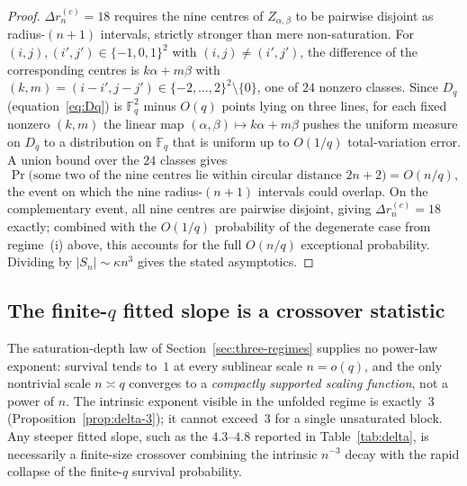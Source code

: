     \begin{proof}
      $\Delta r_n^{(c)}=18$ requires the nine centres of $Z_{\alpha,\beta}$ to be pairwise
      disjoint as radius-$(n{+}1)$ intervals, strictly stronger than mere non-saturation.
      For $(i,j),(i',j')\in\{-1,0,1\}^2$ with $(i,j)\neq(i',j')$, the difference of the
      corresponding centres is $k\alpha+m\beta$ with $(k,m)=(i-i',j-j')\in\{-2,\dots,2\}^2
      \setminus\{0\}$, one of $24$ nonzero classes.
      Since $D_q$ (equation~\eqref{eq:Dq}) is $\mathbb{F}_q^2$ minus $O(q)$ points lying on
      three lines, for each fixed nonzero $(k,m)$ the linear map
      $(\alpha,\beta)\mapsto k\alpha+m\beta$ pushes the uniform measure on $D_q$ to a
      distribution on $\mathbb{F}_q$ that is uniform up to $O(1/q)$ total-variation error.
      A union bound over the $24$ classes gives
      \[
        \Pr\bigl(\text{some two of the nine centres lie within circular distance }2n{+}2\bigr)
        = O(n/q),
      \]
      the event on which the nine radius-$(n{+}1)$ intervals could overlap.
      On the complementary event, all nine centres are pairwise disjoint, giving
      $\Delta r_n^{(c)}=18$ exactly; combined with the $O(1/q)$ probability of the
      degenerate case from regime~(i) above, this accounts for the full $O(n/q)$ exceptional
      probability.
      Dividing by $|S_n|\sim\kappa n^3$ gives the stated asymptotics.
    \end{proof}

  \subsection{The finite-$q$ fitted slope is a crossover statistic}
    \label{sec:crossover}

    The saturation-depth law of Section~\ref{sec:three-regimes} supplies no power-law
    exponent: survival tends to~$1$ at every sublinear scale $n=o(q)$, and the only
    nontrivial scale $n\asymp q$ converges to a \emph{compactly supported scaling function},
    not a power of $n$.
    The intrinsic exponent visible in the unfolded regime is exactly~$3$
    (Proposition~\ref{prop:delta-3}); it cannot exceed~$3$ for a single unsaturated block.
    Any steeper fitted slope, such as the $4.3$--$4.8$ reported in
    Table~\ref{tab:delta}, is necessarily a finite-size crossover combining the intrinsic
    $n^{-3}$ decay with the rapid collapse of the finite-$q$ survival probability.

